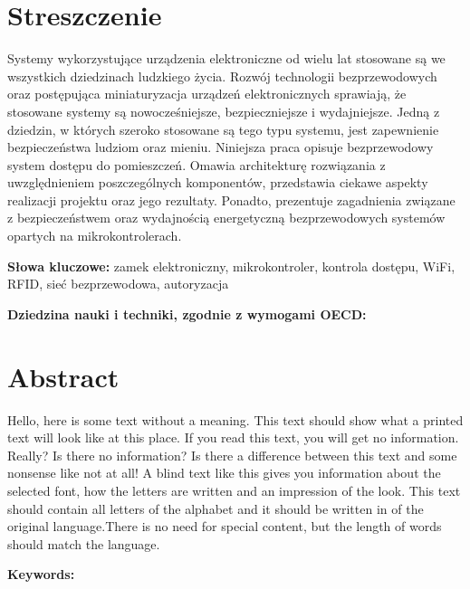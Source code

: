\section*{Streszczenie}
Systemy wykorzystujące urządzenia elektroniczne od wielu lat stosowane są we wszystkich dziedzinach ludzkiego życia. Rozwój technologii bezprzewodowych oraz postępująca miniaturyzacja urządzeń elektronicznych sprawiają, że stosowane systemy są nowocześniejsze, bezpieczniejsze i wydajniejsze.
Jedną z dziedzin, w których szeroko stosowane są tego typu systemu, jest zapewnienie bezpieczeństwa ludziom oraz mieniu.
Niniejsza praca opisuje bezprzewodowy system dostępu do pomieszczeń. Omawia
architekturę rozwiązania z uwzględnieniem poszczególnych komponentów, przedstawia
ciekawe aspekty realizacji projektu oraz jego rezultaty. Ponadto, prezentuje
zagadnienia związane z bezpieczeństwem oraz wydajnością energetyczną bezprzewodowych systemów opartych na
mikrokontrolerach.

\textbf{Słowa kluczowe:} zamek elektroniczny, mikrokontroler, kontrola dostępu, WiFi, RFID, sieć bezprzewodowa, autoryzacja

\textbf{Dziedzina nauki i techniki, zgodnie z wymogami OECD:}

\section*{Abstract}
Hello, here is some text without a meaning.  This text should show what
a printed text will look like at this place.  If you read this text,
you will get no information.  Really?  Is there no information?  Is there
a difference between this text and some nonsense like not at all!  A
blind text like this gives you information about the selected font, how
the letters are written and an impression of the look.  This text should
contain all letters of the alphabet and it should be written in of the
original language.There is no need for special content, but the length of
words should match the language.

\textbf{Keywords:}